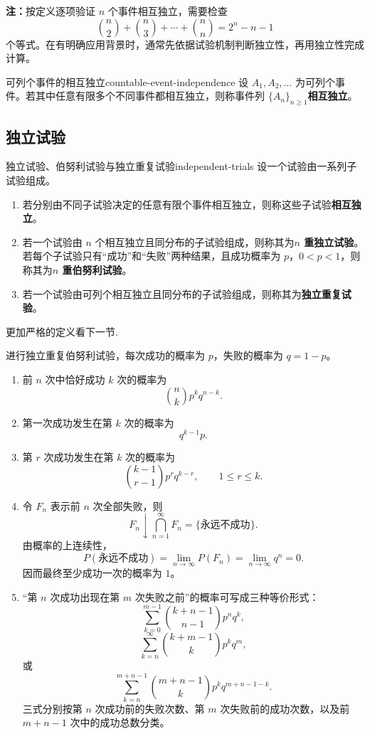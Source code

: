 \textbf{注：}\quad 按定义逐项验证 $n$ 个事件相互独立，需要检查
\[
\binom n2+\binom n3+\cdots+\binom nn=2^n-n-1
\]
个等式。在有明确应用背景时，通常先依据试验机制判断独立性，再用独立性完成计算。

\begin{mydefinition}{可列个事件的相互独立}{countable-event-independence}
设 $A_1,A_2,\ldots$ 为可列个事件。若其中任意有限多个不同事件都相互独立，则称事件列 $\{A_n\}_{n\geq1}$\textbf{相互独立}。
\end{mydefinition}

\subsection*{独立试验}

\begin{mydefinition}{独立试验、伯努利试验与独立重复试验}{independent-trials}
设一个试验由一系列子试验组成。
\begin{enumerate}
    \item 若分别由不同子试验决定的任意有限个事件相互独立，则称这些子试验\textbf{相互独立}。
    \item 若一个试验由 $n$ 个相互独立且同分布的子试验组成，则称其为\textbf{$n$ 重独立试验}。若每个子试验只有“成功”和“失败”两种结果，且成功概率为 $p$，$0<p<1$，则称其为\textbf{$n$ 重伯努利试验}。
    \item 若一个试验由可列个相互独立且同分布的子试验组成，则称其为\textbf{独立重复试验}。
\end{enumerate}
\end{mydefinition}
更加严格的定义看下一节.

\begin{example}[伯努利试验中的常用计算]
进行独立重复伯努利试验，每次成功的概率为 $p$，失败的概率为 $q=1-p$。
\begin{enumerate}
    \item 前 $n$ 次中恰好成功 $k$ 次的概率为
    \[
    \binom nk p^kq^{n-k}.
    \]
    \item 第一次成功发生在第 $k$ 次的概率为
    \[
    q^{k-1}p.
    \]
    \item 第 $r$ 次成功发生在第 $k$ 次的概率为
    \[
    \binom{k-1}{r-1}p^rq^{k-r},
    \qquad 1\leq r\leq k.
    \]
    \item 令 $F_n$ 表示前 $n$ 次全部失败，则
    \[
    F_n\downarrow\bigcap_{n=1}^{\infty}F_n
    =\{\text{永远不成功}\}.
    \]
    由概率的上连续性，
    \[
    P(\text{永远不成功})
    =\lim_{n\to\infty}P(F_n)
    =\lim_{n\to\infty}q^n=0.
    \]
    因而最终至少成功一次的概率为 $1$。
    \item “第 $n$ 次成功出现在第 $m$ 次失败之前”的概率可写成三种等价形式：
    \[
    \sum_{k=0}^{m-1}\binom{k+n-1}{n-1}p^nq^k,
    \]
    \[
    \sum_{k=n}^{\infty}\binom{k+m-1}{k}p^kq^m,
    \]
    或
    \[
    \sum_{k=n}^{m+n-1}\binom{m+n-1}{k}p^kq^{m+n-1-k}.
    \]
    三式分别按第 $n$ 次成功前的失败次数、第 $m$ 次失败前的成功次数，以及前 $m+n-1$ 次中的成功总数分类。
\end{enumerate}
\end{example}

